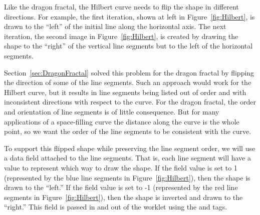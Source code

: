 Like the dragon fractal, the Hilbert curve needs to flip the shape in different directions.
For example, the first iteration, shown at left in Figure~\ref{fig:Hilbert}, is drawn to the ``left'' of the initial line along the horizontal axis.
The next iteration, the second image in Figure~\ref{fig:Hilbert}, is created by drawing the shape to the ``right'' of the vertical line segments but to the left of the horizontal segments.

Section~\ref{sec:DragonFractal} solved this problem for the dragon fractal by flipping the direction of some of the line segments.
Such an approach would work for the Hilbert curve, but it results in line segments being listed out of order and with inconsistent directions with respect to the curve.
For the dragon fractal, the order and orientation of line segments is of little consequence.
But for many applications of a space-filling curve the distance along the curve is the whole point, so we want the order of the line segments to be consistent with the curve.

To support this flipped shape while preserving the line segment order, we will use a data field attached to the line segments.
That is, each line segment will have a value to represent which way to draw the shape.
If the field value is set to 1 (represented by the blue line segments in Figure~\ref{fig:Hilbert}), then the shape is drawn to the ``left.''
If the field value is set to -1 (represented by the red line segments in Figure~\ref{fig:Hilbert}), then the shape is inverted and drawn to the ``right.''
This field is passed in and out of the worklet using the  and  tags.




